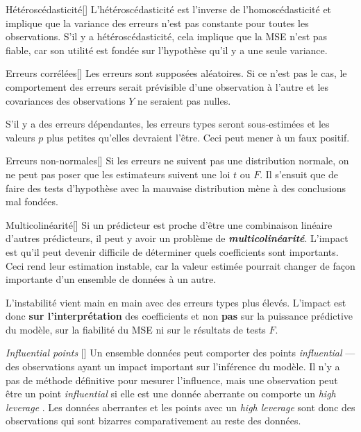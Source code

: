 \documentclass[french]{article}
\begin{document}
\begin{multicols*}{2}
\begin{definitionGENERAL}{Hétéroscédasticité}[]
L'hétéroscédasticité est l'inverse de l'homoscédasticité et implique que la variance des erreurs n'est pas constante pour toutes les observations. S'il y a hétéroscédasticité, cela implique que la MSE n'est pas fiable, car son utilité est fondée sur l'hypothèse qu'il y a une seule variance.
\end{definitionGENERAL}

\begin{definitionGENERAL}{Erreurs corrélées}[]
Les erreurs sont supposées aléatoires. Si ce n'est pas le cas, le comportement des erreurs serait prévisible d'une observation à l'autre et les covariances des observations $Y$ ne seraient pas nulles.

\bigskip

S'il y a des erreurs dépendantes, les erreurs types seront sous-estimées et les valeurs $p$ plus petites qu'elles devraient l'être. Ceci peut mener à un faux positif.
\end{definitionGENERAL}

\begin{definitionGENERAL}{Erreurs non-normales}[]
Si les erreurs ne suivent pas une distribution normale, on ne peut pas poser que les estimateurs suivent une loi $t$ ou $F$. Il s'ensuit que de faire des tests d'hypothèse avec la mauvaise distribution mène à des conclusions mal fondées.
\end{definitionGENERAL}

\begin{definitionGENERAL}{\hypertarget{multicolin}{Multicolinéarité}}[]
Si un prédicteur est proche d'être une combinaison linéaire d'autres prédicteurs, il peut y avoir un problème de \textbf{\textit{multicolinéarité}}. L'impact est qu'il peut devenir difficile de déterminer quels coefficients sont importants. Ceci rend leur estimation instable, car la valeur estimée pourrait changer de façon importante d'un ensemble de données à un autre.

\bigskip

L'instabilité vient main en main avec des erreurs types plus élevés. L'impact est donc \textbf{sur l'interprétation} des coefficients et non \textbf{pas} sur la puissance prédictive du modèle, sur la fiabilité du MSE ni sur le résultats de tests $F$.
\end{definitionGENERAL}

\begin{definitionGENERAL}{\og \textit{Influential points} \fg{}}[]
Un ensemble données peut comporter des points \og \textit{influential} \fg{}---des observations ayant un impact important sur l'inférence du modèle. Il n'y a pas de méthode définitive pour mesurer l'influence, mais une observation peut être un point \og \textit{influential} \fg{} si elle est une donnée aberrante ou comporte un \og \textit{high leverage} \fg{}. Les données aberrantes et les points avec un \og \textit{high leverage} \fg{} sont donc des observations qui sont bizarres comparativement au reste des données. 


\end{definitionGENERAL}
\end{multicols*}
\end{document}
